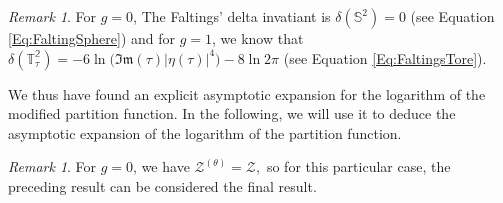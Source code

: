 \documentclass{article}
\theoremstyle{definition}
\theoremstyle{remark}
\newtheorem{Remark}[theorem]{Remark}
\begin{document}
\begin{Remark}
    For $g=0$, The Faltings' delta invatiant is $\delta(\mathbb{S}^{2})=0$ (see Equation \eqref{Eq:FaltingSphere}) and for $g=1$, we know that  $\delta(\mathbb{T^{2}_{\tau}})=-6\ln \big( \mathfrak{Im}(\tau)|\eta(\tau)|^{4} \big)-8\ln2\pi$ (see Equation \eqref{Eq:FaltingsTore}).
\end{Remark}
We thus have found an explicit asymptotic expansion for the logarithm of the modified partition function. In the following, we will use it to deduce the asymptotic expansion of the logarithm of the partition function.

\begin{Remark}
    For $g=0$, we have $\mathcal{Z}^{(\theta)}=\mathcal{Z},$ so for this particular case, the preceding result can be considered the final result.
\end{Remark}
\end{document}
